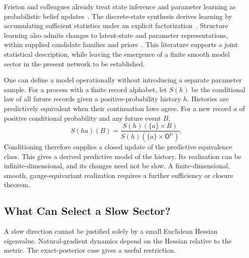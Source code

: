 Friston and colleagues already treat state inference and parameter learning as probabilistic belief updates~\cite{friston2016active}. The discrete-state synthesis derives learning by accumulating sufficient statistics under an explicit factorization~\cite[Sec.~8 and App.~A.1]{DaCosta2020DiscreteSynthesis}. Structure learning also admits changes to latent-state and parameter representations, within supplied candidate families and priors~\cite[Secs.~1--3]{Friston2024StructureLearning}. This literature supports a joint statistical description, while leaving the emergence of a finite smooth model sector in the present network to be established.

One can define a model operationally without introducing a separate parameter sample. For a process with a finite record alphabet, let $S(h)$ be the conditional law of all future records given a positive-probability history $h$. Histories are predictively equivalent when their continuation laws agree. For a new record $a$ of positive conditional probability and any future event $B$,
\begin{equation}
S(ha)(B)=\frac{S(h)(\{a\}\times B)}{S(h)(\{a\}\times\mathsf O^{\mathbb N})}.
\label{eq:predictive_state_recursion}
\end{equation}
Conditioning therefore supplies a closed update of the predictive equivalence class. This gives a derived predictive model of the history. Its realization can be infinite-dimensional, and its changes need not be slow. A finite-dimensional, smooth, gauge-equivariant realization requires a further sufficiency or closure theorem.

\subsection{What Can Select a Slow Sector?}
\label{sec:intrinsic_slow_sector}

A slow direction cannot be justified solely by a small Euclidean Hessian eigenvalue. Natural-gradient dynamics depend on the Hessian relative to the metric. The exact-posterior case gives a useful restriction.

